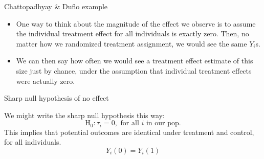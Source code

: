 \documentclass[xcolor={dvipsnames},handout]{beamer}
\begin{document}
\begin{frame}{Chattopadhyay \& Duflo example}

\begin{itemize}
\item One way to think about the magnitude of the effect we observe is to assume the individual treatment effect for all individuals is exactly zero. Then, no matter how we randomized treatment assignment, we would see the same $Y_i$s.
\item We can then say how often we would see a treatment effect estimate of this size just by chance, under the assumption that individual treatment effects were actually zero.
\end{itemize}

\end{frame}



%
%
%
%
%
%
%
%
%
\begin{frame}{Sharp null hypothesis of no effect}

We might write the sharp null hypothesis this way:
$$
\text{H}_0:\tau_i = 0, \text{ for all } i \text{ in our pop.}
$$
This implies that potential outcomes are identical under treatment and control, for all individuals.
$$
Y_i(0) = Y_i(1)
$$

\end{frame}
\end{document}
